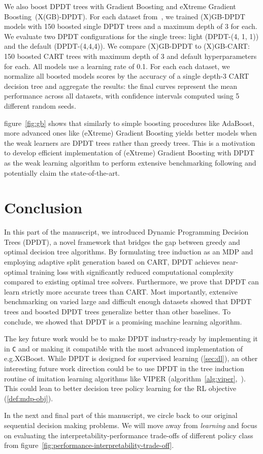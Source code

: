 We also boost DPDT trees with Gradient Boosting and eXtreme Gradient Boosting~\cite{FriedmanBoosting,stcohFriedman,xgb}(X(GB)-DPDT). For each dataset from~\cite{grinsztajn2022tree}, we trained (X)GB-DPDT models with 150 boosted single DPDT trees and a maximum depth of 3 for each. We evaluate two DPDT configurations for the single trees: light (DPDT-(4, 1, 1)) and the default (DPDT-(4,4,4)). We compare (X)GB-DPDT to (X)GB-CART: 150 boosted CART trees with maximum depth of 3 and default hyperparameters for each. All models use a learning rate of 0.1. For each each dataset, we normalize all boosted models scores by the accuracy of a single depth-3 CART decision tree and aggregate the results: the final curves represent the mean performance across all datasets, with confidence intervals computed using 5 different random seeds.

figure~\ref{fig:gb} shows that similarly to simple boosting procedures like AdaBoost, more advanced ones like (eXtreme) Gradient Boosting yields better models when the weak learners are DPDT trees rather than greedy trees. This is a motivation to develop efficient implementation of (eXtreme) Gradient Boosting with DPDT as the weak learning algorithm to perform extensive benchmarking following \cite{grinsztajn2022tree} and potentially claim the state-of-the-art.



\section{Conclusion}\label{sec:ccl-dpdt}

In this part of the manuscript, we introduced Dynamic Programming Decision Trees (DPDT), a novel framework that bridges the gap between greedy and optimal decision tree algorithms. By formulating tree induction as an MDP and employing adaptive split generation based on CART, DPDT achieves near-optimal training loss with significantly reduced computational complexity compared to existing optimal tree solvers. Furthermore, we prove that DPDT can learn strictly more accurate trees than CART. 
Most importantly, extensive benchmarking on varied large and difficult enough datasets showed that DPDT trees and boosted DPDT trees generalize better than other baselines. To conclude, we showed that DPDT is a promising machine learning algorithm. 

The key future work would be to make DPDT industry-ready by implementing it in \texttt{C} and or making it compatible with the most advanced implementation of e.g.\@ XGBoost.
While DPDT is designed for supervised learning (\ref{sec:dl}), an other interesting future work direction could be to use DPDT in the tree induction routine of imitation learning algorithms like VIPER (algorithm~\ref{alg:viper},~\cite{viper}).
This could lean to better decision tree policy learning for the RL objective (\ref{def:mdp-obj}).

In the next and final part of this manuscript, we circle back to our original sequential decision making problems.
We will move away from \textit{learning} and focus on evaluating the interpretability-performance trade-offs of different policy class from figure~\ref{fig:performance-interpretability-trade-off}.
